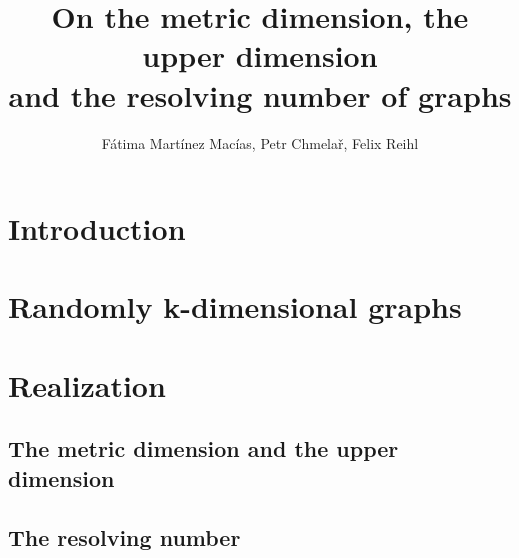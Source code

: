 \documentclass[hyperref={pdfpagelabels=false}]{beamer}
\title{On the metric dimension, the upper dimension\\ and the resolving number of graphs}
\author{Fátima Martínez Macías, Petr Chmela\v{r}, Felix Reihl}
\date{}
\begin{document}
\begin{frame}
	\titlepage
\end{frame} 
\begin{frame}
	\tableofcontents
\end{frame} 
\section{Introduction}
\begin{frame}
\end{frame}
\section{Randomly k-dimensional graphs}
\begin{frame}
\end{frame}
\section{Realization}
\subsection{The metric dimension and the upper dimension}
\begin{frame}
\end{frame}
\subsection{The resolving number}
\begin{frame}
\end{frame}
\end{document}
